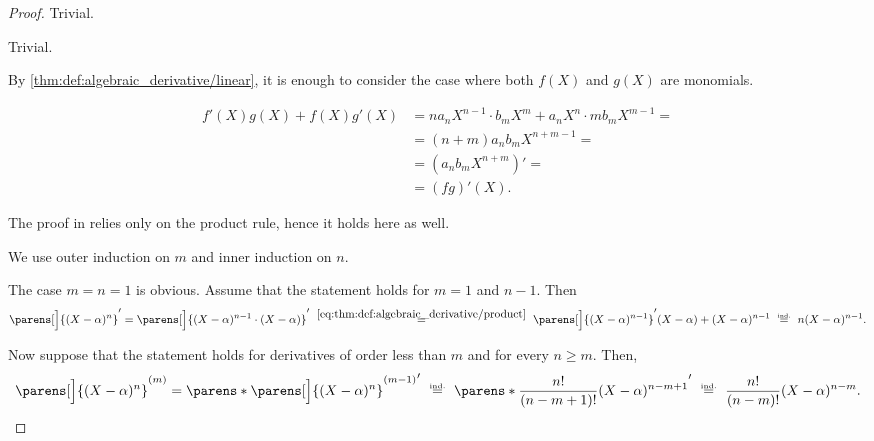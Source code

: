 \begin{proof}
   Trivial.

   Trivial.

   By \cref{thm:def:algebraic_derivative/linear}, it is enough to consider the case where both \( f(X) \) and \( g(X) \) are monomials.

  \begin{align*}
    f'(X) g(X) + f(X) g'(X)
    &=
    n a_n X^{n-1} \cdot b_m X^m + a_n X^n \cdot m b_m X^{m-1}
    = \\ &=
    (n + m) a_n b_m X^{n+m-1}
    = \\ &=
    (a_n b_m X^{n+m})'
    = \\ &=
    (fg)'(X).
  \end{align*}

   The proof in  relies only on the product rule, hence it holds here as well.

   We use outer induction on \( m \) and inner induction on \( n \).

  The case \( m = n = 1 \) is obvious. Assume that the statement holds for \( m = 1 \) and \( n - 1 \). Then
  \begin{equation*}
    \parens[\Big]{ (X - \alpha)^n }'
    =
    \parens[\Big]{ (X - \alpha)^{n-1} \cdot (X - \alpha) }'
    \reloset {\eqref{eq:thm:def:algebraic_derivative/product}} =
    \parens[\Big]{ (X - \alpha)^{n-1} }' (X - \alpha) + (X - \alpha)^{n-1}
    \reloset {\T{ind.}} =
    n (X - \alpha)^{n-1}.
  \end{equation*}

  Now suppose that the statement holds for derivatives of order less than \( m \) and for every \( n \geq m \). Then,
  \begin{equation*}
    \parens[\Big]{ (X - \alpha)^n }^{(m)}
    =
    \parens*{\parens[\Big]{ (X - \alpha)^n }^{(m-1)}}'
    \reloset {\T{ind.}} =
    \parens*{ \frac {n!} {(n - m + 1)!} (X - \alpha)^{n - m + 1} }'
    \reloset {\T{ind.}} =
    \frac {n!} {(n - m)!} (X - \alpha)^{n - m}.
  \end{equation*}
\end{proof}

